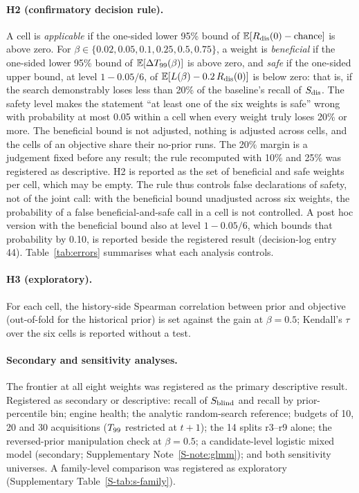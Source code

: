 \paragraph{H2 (confirmatory decision rule).} A cell is \emph{applicable} if the one-sided lower 95\% bound of
$\mathbb{E}[R_{\mathrm{dis}}(0)-\text{chance}]$ is above zero. For $\beta\in\{0.02,0.05,0.1,0.25,0.5,0.75\}$, a weight is \emph{beneficial} if
the one-sided lower 95\% bound of $\mathbb{E}[\Delta T_{99}(\beta)]$ is above zero, and \emph{safe} if the one-sided upper bound, at level
$1-0.05/6$, of $\mathbb{E}[L(\beta)-0.2\,R_{\mathrm{dis}}(0)]$ is below zero: that is, if the search demonstrably loses less than 20\% of the
baseline's recall of $S_{\mathrm{dis}}$. The safety level makes the statement ``at least one of the six weights is safe'' wrong with
probability at most 0.05 within a cell when every weight truly loses 20\% or more. The beneficial bound is not adjusted, nothing
is adjusted across cells, and the cells of an objective share their no-prior runs. The 20\% margin is a judgement fixed before
any result; the rule recomputed with 10\% and 25\% was registered as descriptive. H2 is reported as the set of beneficial and safe
weights per cell, which may be empty. The rule thus controls false declarations of safety, not of the joint call: with the
beneficial bound unadjusted across six weights, the probability of a false beneficial-and-safe call in a cell is not controlled. A
post hoc version with the beneficial bound also at level $1-0.05/6$, which bounds that probability by 0.10, is reported beside the
registered result (decision-log entry 44). Table~\ref{tab:errors} summarises what each analysis controls.

\paragraph{H3 (exploratory).} For each cell, the history-side Spearman correlation between prior and objective (out-of-fold for
the historical prior) is set against the gain at $\beta=0.5$; Kendall's $\tau$ over the six cells is reported without a test.

\paragraph{Secondary and sensitivity analyses.} The frontier at all eight weights was registered as the primary descriptive
result. Registered as secondary or descriptive: recall of $S_{\mathrm{blind}}$ and recall by prior-percentile bin; engine health; the
analytic random-search reference; budgets of 10, 20 and 30 acquisitions ($T_{99}$ restricted at $t+1$); the 14 splits r3--r9 alone;
the reversed-prior manipulation check at $\beta=0.5$; a candidate-level logistic mixed model (secondary; Supplementary
Note~\ref{S-note:glmm}); and both sensitivity universes. A family-level comparison was registered as exploratory (Supplementary
Table~\ref{S-tab:s-family}).

